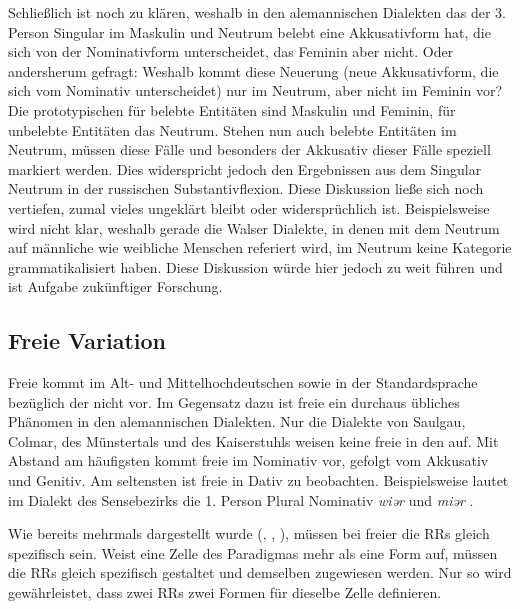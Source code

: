 Schließlich ist noch zu klären, weshalb in den alemannischen Dialekten das  der 3. Person Singular im Maskulin und Neutrum belebt eine Akkusativform hat, die sich von der Nominativform unterscheidet, das Feminin aber nicht. Oder andersherum gefragt: Weshalb kommt diese Neuerung (neue Akkusativform, die sich vom Nominativ unterscheidet) nur im Neutrum, aber nicht im Feminin vor? Die prototypischen  für belebte Entitäten sind Maskulin und Feminin, für unbelebte Entitäten das Neutrum. Stehen nun auch belebte Entitäten im Neutrum, müssen diese Fälle und besonders der Akkusativ dieser Fälle speziell markiert werden. Dies widerspricht jedoch den Ergebnissen aus dem Singular Neutrum in der russischen Substantivflexion. Diese Diskussion ließe sich noch vertiefen, zumal vieles ungeklärt bleibt oder widersprüchlich ist. Beispielsweise wird nicht klar, weshalb gerade die Walser Dialekte, in denen mit dem Neutrum auf männliche wie weibliche Menschen referiert wird, im Neutrum keine Kategorie  grammatikalisiert haben. Diese Diskussion würde hier jedoch zu weit führen und ist Aufgabe zukünftiger Forschung.

\subsection{Freie Variation}\label{5.3.4}

Freie  kommt im Alt- und Mittelhochdeutschen sowie in der Standardsprache bezüglich der  nicht vor. Im Gegensatz dazu ist freie  ein durchaus übliches Phänomen in den alemannischen Dialekten. Nur die Dialekte von Saulgau, Colmar, des Münstertals und des Kaiserstuhls weisen keine freie  in den  auf. Mit Abstand am häufigsten kommt freie  im Nominativ vor, gefolgt vom Akkusativ und Genitiv. Am seltensten ist freie  in Dativ zu beobachten. Beispielsweise lautet im Dialekt des Sensebezirks die 1. Person Plural Nominativ \textit{wiər} und \textit{miər} \citep[196]{Henzen1927}.

Wie bereits mehrmals dargestellt wurde (, , ), müssen bei freier  die RRs gleich spezifisch sein. Weist eine Zelle des Paradigmas mehr als eine Form auf, müssen die RRs gleich spezifisch gestaltet und demselben  zugewiesen werden. Nur so wird gewährleistet, dass zwei RRs zwei Formen für dieselbe Zelle definieren.

